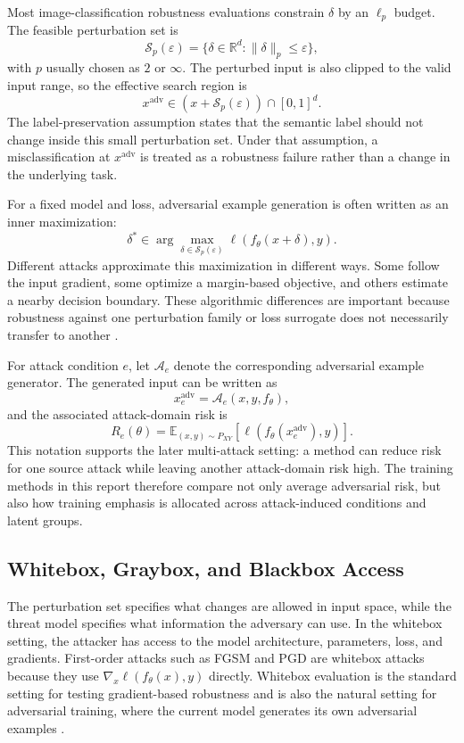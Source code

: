 Most image-classification robustness evaluations constrain $\delta$ by an $\ell_p$ budget. The feasible perturbation set is
\[
\mathcal{S}_p(\varepsilon)=
\{\delta\in\mathbb{R}^{d}:\|\delta\|_p\leq \varepsilon\},
\]
with $p$ usually chosen as $2$ or $\infty$. The perturbed input is also clipped to the valid input range, so the effective search region is
\[
x^{\mathrm{adv}}\in (x+\mathcal{S}_p(\varepsilon))\cap[0,1]^d .
\]
The label-preservation assumption states that the semantic label should not change inside this small perturbation set. Under that assumption, a misclassification at $x^{\mathrm{adv}}$ is treated as a robustness failure rather than a change in the underlying task.

For a fixed model and loss, adversarial example generation is often written as an inner maximization:
\[
\delta^\ast \in
\arg\max_{\delta\in\mathcal{S}_p(\varepsilon)}
\ell(f_\theta(x+\delta),y).
\]
Different attacks approximate this maximization in different ways. Some follow the input gradient, some optimize a margin-based objective, and others estimate a nearby decision boundary. These algorithmic differences are important because robustness against one perturbation family or loss surrogate does not necessarily transfer to another \cite{tramer2019adversarial,maini2020adversarial,croce2020reliable}.

For attack condition $e$, let $\mathcal{A}_e$ denote the corresponding adversarial example generator. The generated input can be written as
\[
x^{\mathrm{adv}}_e=\mathcal{A}_e(x,y,f_\theta),
\]
and the associated attack-domain risk is
\[
R_e(\theta)=
\mathbb{E}_{(x,y)\sim P_{XY}}
\left[
\ell(f_\theta(x^{\mathrm{adv}}_e),y)
\right].
\]
This notation supports the later multi-attack setting: a method can reduce risk for one source attack while leaving another attack-domain risk high. The training methods in this report therefore compare not only average adversarial risk, but also how training emphasis is allocated across attack-induced conditions and latent groups.

\subsection{Whitebox, Graybox, and Blackbox Access}

The perturbation set specifies what changes are allowed in input space, while the threat model specifies what information the adversary can use. In the whitebox setting, the attacker has access to the model architecture, parameters, loss, and gradients. First-order attacks such as FGSM and PGD are whitebox attacks because they use $\nabla_x \ell(f_\theta(x),y)$ directly. Whitebox evaluation is the standard setting for testing gradient-based robustness and is also the natural setting for adversarial training, where the current model generates its own adversarial examples \cite{madry2019towards,athalye2018obfuscated}.


